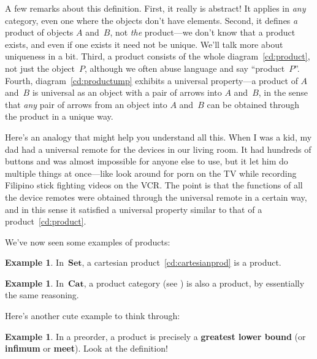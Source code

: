 \documentclass[letterpaper,12pt]{article}
\newcommand{\cat}[1]{\mathbf{#1}}
\newcommand{\Cat}{\cat{Cat}}
\newcommand{\Set}{\cat{Set}}
\newcommand{\textdefn}{\textbf}
\theoremstyle{definition}
\newtheorem{exmp}[equation]{Example}
\theoremstyle{plain}
\numberwithin{equation}{section}
\begin{document}
\noindent A few remarks about this definition. First, it really is abstract! It applies in \emph{any} category, even one where the objects don't have elements. Second, it defines \emph{a} product of objects \(A\) and~\(B\), not \emph{the} product---we don't know that a product exists, and even if one exists it need not be unique. We'll talk more about uniqueness in a bit. Third, a product consists of the whole diagram~\eqref{cd:product}, not just the object~\(P\), although we often abuse language and say ``product~\(P\)''. Fourth, diagram~\eqref{cd:productump} exhibits a universal property---a product of \(A\) and~\(B\) is universal as an object with a pair of arrows into \(A\) and~\(B\), in the sense that \emph{any} pair of arrows from an object into \(A\) and~\(B\) can be obtained through the product in a unique way.

Here's an analogy that might help you understand all this. When I was a kid, my dad had a universal remote for the devices in our living room. It had hundreds of buttons and was almost impossible for anyone else to use, but it let him do multiple things at once---like look around for porn on the TV while recording Filipino stick fighting videos on the VCR. The point is that the functions of all the device remotes were obtained through the universal remote in a certain way, and in this sense it satisfied a universal property similar to that of a product~\eqref{cd:product}.

We've now seen some examples of products:
\begin{exmp}
In~\(\Set\), a cartesian product~\eqref{cd:cartesianprod} is a product.
\end{exmp}
\begin{exmp}
In~\(\Cat\), a product category (see ) is also a product, by essentially the same reasoning.
\end{exmp}
\noindent Here's another cute example to think through:
\begin{exmp}
In a preorder, a product is precisely a \textdefn{greatest lower bound} (or \textdefn{infimum} or \textdefn{meet}). Look at the definition!
\end{exmp}
\end{document}

